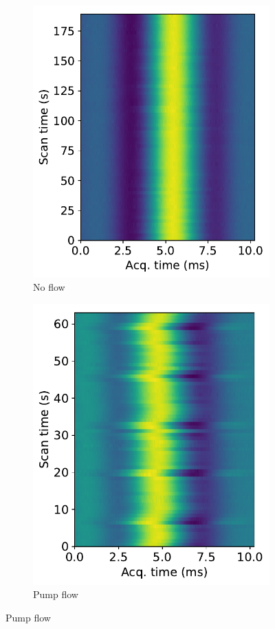 \begin{figure}[htb]
\centering
\begin{subfigure}[t]{0.32\textwidth}
\caption{No flow}
\includegraphics[width=\textwidth]{figures/contflow/flowstabilitynoflow.pdf}
\end{subfigure}
\begin{subfigure}[t]{0.32\textwidth}
\caption{Pump flow}
\includegraphics[width=\textwidth]{figures/contflow/flowstabilitybadpump.pdf}

\end{subfigure}
\end{figure}
